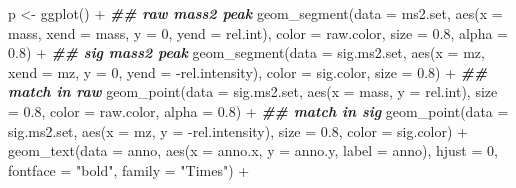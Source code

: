 \documentclass[
]{article}
\newenvironment{Shaded}{\begin{snugshade}}{\end{snugshade}}
\newcommand{\AttributeTok}[1]{\textcolor[rgb]{0.77,0.63,0.00}{#1}}
\newcommand{\DecValTok}[1]{\textcolor[rgb]{0.00,0.00,0.81}{#1}}
\newcommand{\DocumentationTok}[1]{\textcolor[rgb]{0.56,0.35,0.01}{\textbf{\textit{#1}}}}
\newcommand{\FloatTok}[1]{\textcolor[rgb]{0.00,0.00,0.81}{#1}}
\newcommand{\FunctionTok}[1]{\textcolor[rgb]{0.00,0.00,0.00}{#1}}
\newcommand{\NormalTok}[1]{#1}
\newcommand{\OtherTok}[1]{\textcolor[rgb]{0.56,0.35,0.01}{#1}}
\newcommand{\SpecialCharTok}[1]{\textcolor[rgb]{0.00,0.00,0.00}{#1}}
\newcommand{\StringTok}[1]{\textcolor[rgb]{0.31,0.60,0.02}{#1}}
\begin{document}
\begin{Shaded}
\begin{Highlighting}[]
\NormalTok{    p }\OtherTok{\textless{}{-}} \FunctionTok{ggplot}\NormalTok{() }\SpecialCharTok{+}
  \DocumentationTok{\#\# raw mass2 peak}
      \FunctionTok{geom\_segment}\NormalTok{(}\AttributeTok{data =}\NormalTok{ ms2.set,}
                   \FunctionTok{aes}\NormalTok{(}\AttributeTok{x =}\NormalTok{ mass,}
                       \AttributeTok{xend =}\NormalTok{ mass,}
                       \AttributeTok{y =} \DecValTok{0}\NormalTok{,}
                       \AttributeTok{yend =}\NormalTok{ rel.int),}
                   \AttributeTok{color =}\NormalTok{ raw.color,}
                   \AttributeTok{size =} \FloatTok{0.8}\NormalTok{,}
                   \AttributeTok{alpha =} \FloatTok{0.8}\NormalTok{) }\SpecialCharTok{+}
      \DocumentationTok{\#\# sig mass2 peak}
      \FunctionTok{geom\_segment}\NormalTok{(}\AttributeTok{data =}\NormalTok{ sig.ms2.set,}
                   \FunctionTok{aes}\NormalTok{(}\AttributeTok{x =}\NormalTok{ mz,}
                       \AttributeTok{xend =}\NormalTok{ mz,}
                       \AttributeTok{y =} \DecValTok{0}\NormalTok{,}
                       \AttributeTok{yend =} \SpecialCharTok{{-}}\NormalTok{rel.intensity),}
                   \AttributeTok{color =}\NormalTok{ sig.color,}
                   \AttributeTok{size =} \FloatTok{0.8}\NormalTok{) }\SpecialCharTok{+}
      \DocumentationTok{\#\# match in raw}
      \FunctionTok{geom\_point}\NormalTok{(}\AttributeTok{data =}\NormalTok{ sig.ms2.set,}
                 \FunctionTok{aes}\NormalTok{(}\AttributeTok{x =}\NormalTok{ mass,}
                     \AttributeTok{y =}\NormalTok{ rel.int),}
                 \AttributeTok{size =} \FloatTok{0.8}\NormalTok{,}
                 \AttributeTok{color =}\NormalTok{ raw.color,}
                 \AttributeTok{alpha =} \FloatTok{0.8}\NormalTok{) }\SpecialCharTok{+}
      \DocumentationTok{\#\# match in sig}
      \FunctionTok{geom\_point}\NormalTok{(}\AttributeTok{data =}\NormalTok{ sig.ms2.set,}
                 \FunctionTok{aes}\NormalTok{(}\AttributeTok{x =}\NormalTok{ mz,}
                     \AttributeTok{y =} \SpecialCharTok{{-}}\NormalTok{rel.intensity),}
                 \AttributeTok{size =} \FloatTok{0.8}\NormalTok{,}
                 \AttributeTok{color =}\NormalTok{ sig.color) }\SpecialCharTok{+}
      \FunctionTok{geom\_text}\NormalTok{(}\AttributeTok{data =}\NormalTok{ anno,}
                \FunctionTok{aes}\NormalTok{(}\AttributeTok{x =}\NormalTok{ anno.x,}
                    \AttributeTok{y =}\NormalTok{ anno.y,}
                    \AttributeTok{label =}\NormalTok{ anno),}
                \AttributeTok{hjust =} \DecValTok{0}\NormalTok{, }\AttributeTok{fontface =} \StringTok{"bold"}\NormalTok{, }\AttributeTok{family =} \StringTok{"Times"}\NormalTok{) }\SpecialCharTok{+}

\end{Highlighting}
\end{Shaded}
\end{document}
